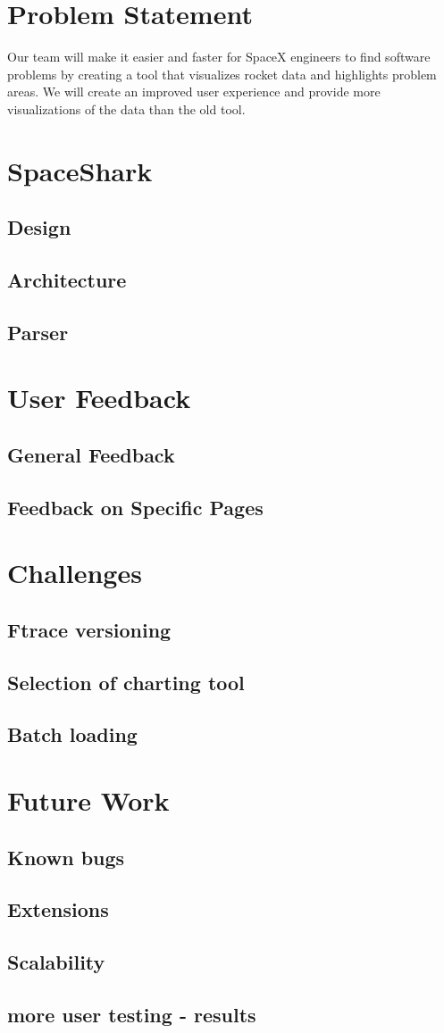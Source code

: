\documentclass[midyear]{hmcclinic}
\begin{document}
\section{Problem Statement} %
Our team will make it easier and faster for SpaceX engineers to find software problems by creating a tool that visualizes rocket data and highlights problem areas. We will create an improved user experience and provide more visualizations of the data than the old tool.

\section{SpaceShark}
\subsection{Design}
\subsection{Architecture}
\subsection{Parser}

\section{User Feedback}
\subsection{General Feedback}
\subsection{Feedback on Specific Pages}

\section{Challenges}
\subsection{Ftrace versioning}
\subsection{Selection of charting tool}
\subsection{Batch loading}

\section{Future Work}
\subsection{Known bugs}
\subsection{Extensions}
\subsection{Scalability}
\subsection{more user testing - results}
\end{document}
